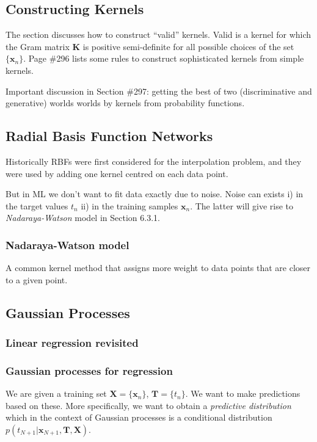\documentclass[a4paper]{article}
\newcommand{\mb}{\mathbf}
\newcommand{\rnote}[1]{#1\reversemarginpar\marginpar{{\textit{{\textcolor{red}{#1}}}}}}
\begin{document}
\subsection{Constructing Kernels}

The section discusses how to construct ``valid'' kernels. Valid is a kernel for which the Gram matrix $\mb{K}$ is positive semi-definite for all possible choices of the set $\{\mb{x}_n\}$. Page \#296 lists some rules to construct sophisticated kernels from simple kernels.

Important discussion in Section \#297: \rnote{getting the best of two (discriminative and generative) worlds} worlds by kernels from probability functions.

\subsection{Radial Basis Function Networks}
Historically RBFs were first considered for the interpolation problem, and they were used by adding one kernel centred on each data point.

But in ML we don't want to fit data exactly due to noise. Noise can exists i) in the target values $t_n$ ii) in the training samples $\mb{x}_n$. The latter will give rise to \textit{Nadaraya-Watson} model in Section 6.3.1.

\subsubsection{Nadaraya-Watson model} 
A common kernel method that assigns more weight to data points that are closer to a given point.

\subsection{Gaussian Processes}
\subsubsection{Linear regression revisited}
\subsubsection{Gaussian processes for regression}
We are given a training set $\mb{X}=\{\mb{x}_n\}$, $\mb{T}=\{t_n\}$. We want to make predictions based on these. More specifically, we want to obtain a \textit{predictive distribution} which in the context of Gaussian processes is a conditional distribution $p(t_{N+1}|\mb{x}_{N+1},\mb{T},\mb{X})$. 
\end{document}
